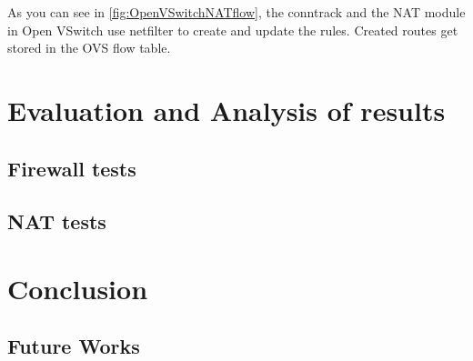 \documentclass[11pt,a4paper,twoside,openright,bachelor,english]{netthesis}
\begin{document}
As you can see in \ref{fig:OpenVSwitchNATflow}, the conntrack and the NAT module in Open VSwitch use netfilter to create and update the rules. Created routes get stored in the OVS flow table. 

\chapter{Evaluation and Analysis of results}

\section{Firewall tests}

\section{NAT tests}

\chapter{Conclusion}

\section{Future Works}


%
\appendix
%

%





\end{document}
